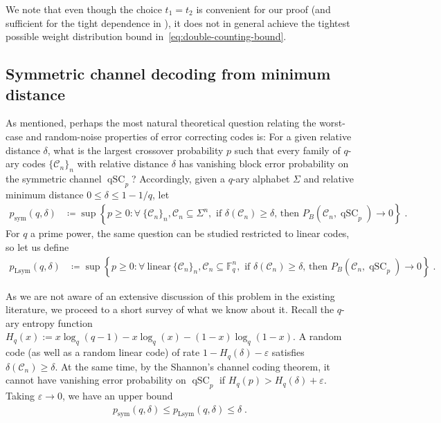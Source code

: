 \documentclass{article}
\newcommand{\eps}{\varepsilon}
\DeclareMathOperator{\qSC}{qSC}
\newcommand{\cC}{\mathcal{C}}
\newcommand{\psym}{p_{\mathrm{sym}}}
\newcommand{\pLsym}{p_{\mathrm{Lsym}}}
\theoremstyle{plain}
\theoremstyle{plain}
\theoremstyle{plain}
\theoremstyle{plain}
\theoremstyle{plain}
\theoremstyle{plain}
\theoremstyle{plain}
\theoremstyle{plain}
\theoremstyle{plain}
\theoremstyle{plain}
\theoremstyle{remark}
\theoremstyle{remark}
\theoremstyle{remark}
\theoremstyle{plain}
\begin{document}
We note that even though the choice $t_1=t_2$ 
is convenient for our proof
(and sufficient for the tight dependence in
), it does not in general
achieve the tightest possible weight distribution 
bound in~\eqref{eq:double-counting-bound}.


\subsection{Symmetric channel decoding
from minimum distance}
\label{sec:intro-distance-vs-qsc}

As mentioned, perhaps
the most natural theoretical question 
relating the worst-case and random-noise properties of error correcting
codes is: For a given relative distance $\delta$, 
what is the largest crossover probability $p$
such that every 
family of $q$-ary codes $\{\cC_n\}_n$ with relative distance
$\delta$ has vanishing block error probability on the symmetric channel $\qSC_p$?
Accordingly, given a $q$-ary alphabet $\Sigma$ and relative minimum distance 
$0\le\delta\le 1-1/q$, let
\begin{align*}
    \psym(q,\delta)&\coloneqq\sup\left\{p\ge 0: \forall\ \{\cC_n\}_n,
    \cC_n\subseteq\Sigma^n,
    \text{ if }\delta(\cC_n)\ge \delta\text{, then } P_B\left(\cC_n,\qSC_p\right)\to 0\right\}\;.
\end{align*}
For $q$ a prime power, the same question can be studied restricted to linear codes, so let us define
\begin{align*}
\pLsym(q,\delta)&\coloneqq\sup\left\{p\ge 0: \forall\ \text{linear}\ \{\cC_n\}_n, \cC_n\subseteq\mathbb{F}_q^n,
    \text{ if } \delta(\cC_n)\ge \delta \text{, then } P_B\left(\cC_n,\qSC_p\right)\to 0\right\}\;.
\end{align*}

As we are not aware of an extensive discussion of this problem in the existing literature, we proceed to a short survey of what we know about it. Recall the $q$-ary entropy function
$H_q(x):=x\log_q(q-1)-x\log_q(x)-(1-x)\log_q(1-x)$.
A random code (as well as a random linear code) 
of rate $1-H_q(\delta)-\eps$ satisfies $\delta(\cC_n)\ge \delta$.
At the same time, by the Shannon's channel coding theorem, it cannot
have vanishing error probability on $\qSC_{p}$ if
$H_q(p)>H_q(\delta)+\eps$. Taking $\eps\to 0$, we have an upper bound
\begin{align}
    \label{eq:psym-upper-bound}
    \psym(q,\delta)\le\pLsym(q, \delta)\le \delta\;.
\end{align}
\end{document}
